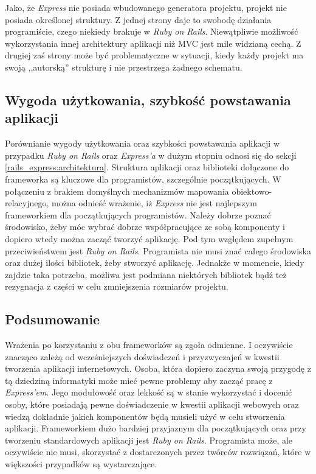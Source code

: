 \documentclass[mgr,oneside]{mgr}
\begin{document}
Jako, że \textit{Express} nie posiada wbudowanego generatora projektu, projekt nie posiada określonej struktury. Z jednej strony daje to swobodę działania programiście, czego niekiedy brakuje w \textit{Ruby on Rails}. Niewątpliwie możliwość wykorzystania innej architektury aplikacji niż MVC jest mile widzianą cechą. Z drugiej zaś strony może być problematyczne w sytuacji, kiedy każdy projekt ma swoją ,,autorską'' strukturę i nie przestrzega żadnego schematu.

\subsection{Wygoda użytkowania, szybkość powstawania aplikacji}
Porównianie wygody użytkowania oraz szybkości powstawania aplikacji w przypadku \textit{Ruby on Rails} oraz \textit{Express'a} w dużym stopniu odnosi się do sekcji \ref{rails_express:architektura}. Struktura aplikacji oraz biblioteki dołączone do frameworka są kluczowe dla programistów, szczególnie początkujących. W połączeniu z brakiem domyślnych mechanizmów mapowania obiektowo-relacyjnego, można odnieść wrażenie, iż \textit{Express} nie jest najlepszym frameworkiem dla początkujących programistów. Należy dobrze poznać środowisko, żeby móc wybrać dobrze współpracujące ze sobą komponenty i dopiero wtedy można zacząć tworzyć aplikację. Pod tym względem zupełnym przeciwieństwem jest \textit{Ruby on Rails}. Programista nie musi znać całego środowiska oraz dużej ilości bibliotek, żeby stworzyć aplikację. Jednakże w momencie, kiedy zajdzie taka potrzeba, możliwa jest podmiana niektórych bibliotek bądź też rezygnacja z części w celu zmniejszenia rozmiarów projektu.

\subsection{Podsumowanie}
Wrażenia po korzystaniu z obu frameworków są zgoła odmienne. I oczywiście znacząco zależą od wcześniejszych doświadczeń i przyzwyczajeń w kwestii tworzenia aplikacji internetowych. Osoba, która dopiero zaczyna swoją przygodę z tą dziedziną informatyki może mieć pewne problemy aby zacząć pracę z \textit{Express'em}. Jego modułowość oraz lekkość są w stanie wykorzystać i docenić osoby, które posiadają pewne doświadczenie w kwestii aplikacji webowych oraz wiedzą dokładnie jakich komponentów będą musieli użyć w celu stworzenia aplikacji. Frameworkiem dużo bardziej przyjaznym dla początkujących oraz przy tworzeniu standardowych aplikacji jest \textit{Ruby on Rails}. Programista może, ale oczywiście nie musi, skorzystać z dostarczonych przez twórców rozwiązań, które w większości przypadków są wystarczające.
\end{document}
